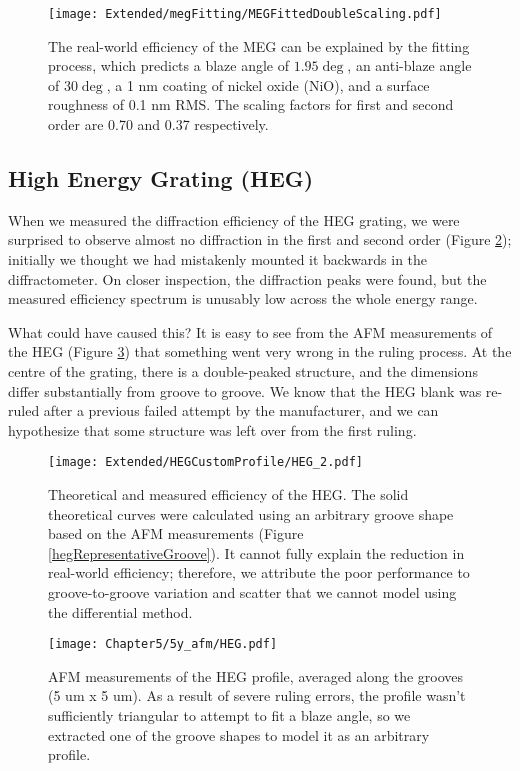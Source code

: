 \begin{figure}[htbp] %
   \centering
   \texttt{[image: Extended/megFitting/MEGFittedDoubleScaling.pdf]} 
   \caption{The real-world efficiency of the MEG can be explained by the fitting process, which predicts a blaze angle of $1.95\deg$, an anti-blaze angle of $30 \deg$, a 1 nm coating of nickel oxide (NiO), and a surface roughness of 0.1 nm RMS.  The scaling factors for first and second order are 0.70 and 0.37 respectively. }
   \label{5x-meg}
\end{figure}

\subsection{High Energy Grating (HEG)}
When we measured the diffraction efficiency of the HEG grating, we were surprised to observe almost no diffraction in the first and second order (Figure \ref{5x-heg}); initially we thought we had mistakenly mounted it backwards in the diffractometer.  On closer inspection, the diffraction peaks were found, but the measured efficiency spectrum is unusably low across the whole energy range.

What could have caused this? It is easy to see from the AFM measurements of the HEG (Figure \ref{5y-heg}) that something went very wrong in the ruling process.  At the centre of the grating, there is a double-peaked structure, and the dimensions differ substantially from groove to groove.  We know that the HEG blank was re-ruled after a previous failed attempt by the manufacturer, and we can hypothesize that some structure was left over from the first ruling.

\begin{figure}[htbp] %
   \centering
   \texttt{[image: Extended/HEGCustomProfile/HEG\_2.pdf]} 
   \caption{Theoretical and measured efficiency of the HEG.  The solid theoretical curves were calculated using an arbitrary groove shape based on the AFM measurements (Figure \ref{hegRepresentativeGroove}).  It cannot fully explain the reduction in real-world efficiency; therefore, we attribute the poor performance to groove-to-groove variation and scatter that we cannot model using the differential method.}
   \label{5x-heg}
\end{figure}

\begin{figure}[htbp] %
   \centering
   \texttt{[image: Chapter5/5y\_afm/HEG.pdf]} 
   \caption{AFM measurements of the HEG profile, averaged along the grooves (5 um x 5 um).  As a result of severe ruling errors, the profile wasn't sufficiently triangular to attempt to fit a blaze angle, so we extracted one of the groove shapes to model it as an arbitrary profile.}
   \label{5y-heg}
\end{figure}

